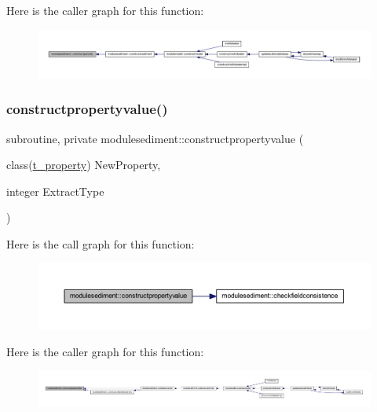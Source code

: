 Here is the caller graph for this function\+:\nopagebreak
\begin{figure}[H]
\begin{center}
\leavevmode
\includegraphics[width=350pt]{namespacemodulesediment_a8ad0bd3e4a8a8ea6fb423df13967b877_icgraph}
\end{center}
\end{figure}
\mbox{\label{namespacemodulesediment_a7df6a75fdbd4ab5caf95fe57492116fd}} 
\subsubsection{\texorpdfstring{constructpropertyvalue()}{constructpropertyvalue()}}
{\footnotesize\ttfamily subroutine, private modulesediment\+::constructpropertyvalue (\begin{DoxyParamCaption}\item[{class(\mbox{\hyperlink{structmodulesediment_1_1t__property}{t\+\_\+property}})}]{New\+Property,  }\item[{integer}]{Extract\+Type }\end{DoxyParamCaption})\hspace{0.3cm}{\ttfamily [private]}}

Here is the call graph for this function\+:\nopagebreak
\begin{figure}[H]
\begin{center}
\leavevmode
\includegraphics[width=350pt]{namespacemodulesediment_a7df6a75fdbd4ab5caf95fe57492116fd_cgraph}
\end{center}
\end{figure}
Here is the caller graph for this function\+:\nopagebreak
\begin{figure}[H]
\begin{center}
\leavevmode
\includegraphics[width=350pt]{namespacemodulesediment_a7df6a75fdbd4ab5caf95fe57492116fd_icgraph}
\end{center}
\end{figure}
\mbox{\label{namespacemodulesediment_a1a3b01f7483f6fefc6f2dac6a51d664c}} 
